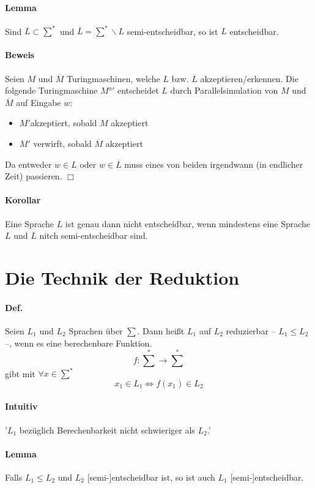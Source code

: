 \paragraph{Lemma} Sind $L \subset \sum^*$ und $\overline{L}=\sum^*\backslash L$ semi-entscheidbar, so ist $L$ entscheidbar.

\paragraph*{Beweis} Seien $M$ und $\overline{M}$ Turingmaschinen, welche $L$ bzw. $\overline{L}$ akzeptieren/erkennen. Die folgende Turingmaschine $M°'$ entscheidet $L$ durch Parallelsimulation von $M$ und $\overline{M}$ auf Eingabe $w$:
\begin{itemize}
	\item $M'$akzeptiert, sobald $M$ akzeptiert
	\item $M'$ verwirft, sobald $\overline{M}$ akzeptiert
\end{itemize}
Da entweder $w\in L$ oder $w\in \overline{L}$ muss eines von beiden irgendwann (in endlicher Zeit) passieren. $\Box$

\paragraph*{Korollar} Eine Sprache $L$ ist genau dann nicht entscheidbar, wenn mindestens eine Sprache $L$ und $\overline{L}$ nitch semi-entscheidbar sind.


\section{Die Technik der Reduktion}

\paragraph*{Def.} Seien $L_1$ und $L_2$ Sprachen über $\sum$. Dann heißt $L_1$ auf $L_2$ reduzierbar -- $L_1 \leq L_2$ --, wenn es eine berechenbare Funktion. $$ f: \sum^* \rightarrow \sum^* $$ gibt mit $\forall x \in \sum^*$ $$ x_1 \in L_1 \Leftrightarrow f(x_1) \in L_2 $$

\paragraph*{Intuitiv} '$L_1$ bezüglich Berechenbarkeit nicht schwieriger als $L_2$.'

\paragraph*{Lemma} Falls $L_1 \leq L_2$ und $L_2$ [semi-]entscheidbar ist, so ist auch $L_1$ [semi-]entscheidbar.

